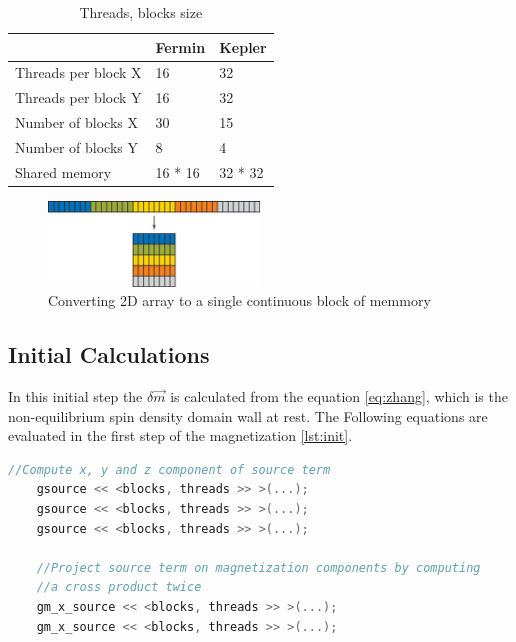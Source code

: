 \begin{table}[h]
\centering
\begin{tabular}{| l | l | l |}
\hline
 & Fermin & Kepler \\
\hline
Threads per block X  & 16 & 32 \\
\hline
Threads per block Y  & 16 & 32 \\
\hline
Number of blocks X & 30 & 15 \\
\hline
Number of blocks Y & 8 & 4 \\
\hline
Shared memory & 16 * 16 & 32 * 32 \\
\hline
\end{tabular}
\caption{Threads, blocks size}
\label{tab:threads}
\end{table}


\begin{figure}[htbp]
	\centering
		\includegraphics[width=0.5\textwidth]{Figures/flaten.png}
		\smallskip
	\caption[2D Flatten array]{Converting 2D array to a single continuous block of memmory}
	\label{fig:flaten}
\end{figure}


\subsection{Initial Calculations}

In this initial step the $ \delta \vec{m}$ is calculated from the equation \ref{eq:zhang}, which is the non-equilibrium spin density \cite{claudio} domain wall at rest. The Following equations are evaluated in the first step of the magnetization \ref{lst:init}.

\begin{lstlisting}[language=C++, label={lst:init}, caption={Initial calculations}]
	//Compute x, y and z component of source term
    gsource << <blocks, threads >> >(...);
    gsource << <blocks, threads >> >(...);
    gsource << <blocks, threads >> >(...);

    //Project source term on magnetization components by computing
    //a cross product twice
    gm_x_source << <blocks, threads >> >(...);
    gm_x_source << <blocks, threads >> >(...);
\end{lstlisting}

